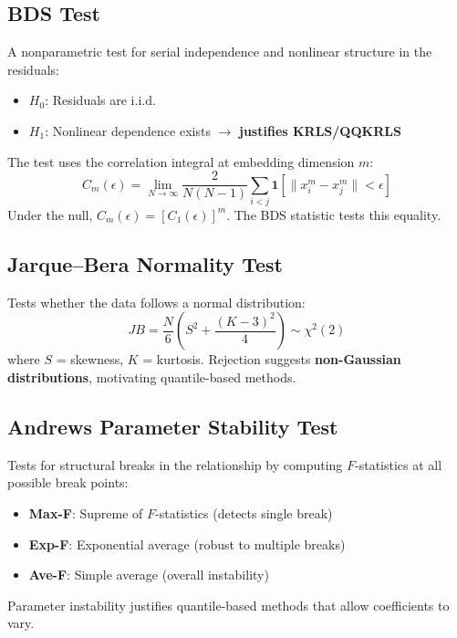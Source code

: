 \subsection{BDS Test}

\begin{definitionbox}
A nonparametric test for serial independence and nonlinear structure in the residuals:
\begin{itemize}[leftmargin=1.5em]
\item $H_0$: Residuals are i.i.d.
\item $H_1$: Nonlinear dependence exists $\to$ \textbf{justifies KRLS/QQKRLS}
\end{itemize}
The test uses the correlation integral at embedding dimension $m$:
\begin{equation}
C_m(\epsilon) = \lim_{N \to \infty} \frac{2}{N(N-1)} \sum_{i<j} \mathbf{1}\!\left[\|x_i^m - x_j^m\| < \epsilon\right]
\end{equation}
Under the null, $C_m(\epsilon) = [C_1(\epsilon)]^m$. The BDS statistic tests this equality.
\end{definitionbox}

\subsection{Jarque--Bera Normality Test}

\begin{definitionbox}
Tests whether the data follows a normal distribution:
\begin{equation}
JB = \frac{N}{6}\left(S^2 + \frac{(K-3)^2}{4}\right) \sim \chi^2(2)
\end{equation}
where $S$ = skewness, $K$ = kurtosis. Rejection suggests \textbf{non-Gaussian distributions}, motivating quantile-based methods.
\end{definitionbox}

\subsection{Andrews Parameter Stability Test}

\begin{definitionbox}
Tests for structural breaks in the relationship by computing $F$-statistics at all possible break points:
\begin{itemize}[leftmargin=1.5em]
\item \textbf{Max-F}: Supreme of $F$-statistics (detects single break)
\item \textbf{Exp-F}: Exponential average (robust to multiple breaks)
\item \textbf{Ave-F}: Simple average (overall instability)
\end{itemize}
Parameter instability justifies quantile-based methods that allow coefficients to vary.
\end{definitionbox}


